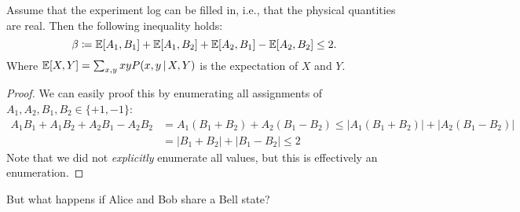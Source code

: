 		\begin{theorem}
			Assume that the experiment log can be filled in, i.e., that the physical quantities are real. Then the following inequality holds:
			\begin{equation}
				\beta \coloneqq \mathbb{E}[A_1, B_1] + \mathbb{E}[A_1, B_2] + \mathbb{E}[A_2, B_1] - \mathbb{E}[A_2, B_2] \leq 2.
			\end{equation}
			Where \( \mathbb{E}[X, Y] = \sum_{x, y} x y P(x, y \,\vert\, X, Y) \) is the expectation of \(X\) and \(Y\).
		\end{theorem}
		\begin{proof}
			We can easily proof this by enumerating all assignments of \( A_1, A_2, B_1, B_2 \in \{ +1, -1 \} \):
			\begin{align}
				A_1 B_1 + A_1 B_2 + A_2 B_1 - A_2 B_2
				 & = A_1 (B_1 + B_2) + A_2 (B_1 - B_2)
				\leq \bigl\lvert A_1 (B_1 + B_2) \bigr\rvert + \bigl\lvert A_2 (B_1 - B_2) \bigr\rvert \\
				 & = \bigl\lvert B_1 + B_2 \bigr\rvert + \bigl\lvert B_1 - B_2 \bigr\rvert
				\leq 2
			\end{align}
			Note that we did not \emph{explicitly} enumerate all values, but this is effectively an enumeration.
		\end{proof}
		But what happens if Alice and Bob share a Bell state?

